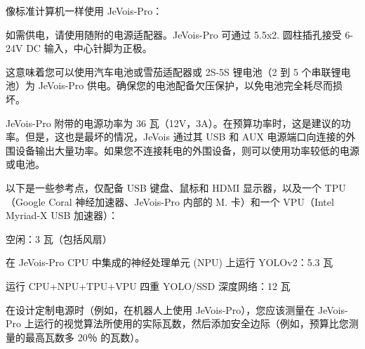 像标准计算机一样使用 Je\+Vois-\/\+Pro：

  

如需供电，请使用随附的电源适配器。\+Je\+Vois-\/\+Pro 可通过 5.\+5x2.\+5mm 圆柱插孔接受 6-\/24V DC 输入，中心针脚为正极。

这意味着您可以使用汽车电池或雪茄适配器或 2S-\/5S 锂电池（2 到 5 个串联锂电池）为 Je\+Vois-\/\+Pro 供电。确保您的电池配备欠压保护，以免电池完全耗尽而损坏。

Je\+Vois-\/\+Pro 附带的电源功率为 36 瓦（12\+V，3\+A）。在预算功率时，这是建议的功率。但是，这也是最坏的情况，\+Je\+Vois 通过其 U\+SB 和 A\+UX 电源端口向连接的外围设备输出大量功率。如果您不连接耗电的外围设备，则可以使用功率较低的电源或电池。

以下是一些参考点，仅配备 U\+SB 键盘、鼠标和 H\+D\+MI 显示器，以及一个 T\+P\+U（\+Google Coral 神经加速器、\+Je\+Vois-\/\+Pro 内部的 M. 卡）和一个 V\+P\+U（\+Intel Myriad-\/X U\+SB 加速器）：


\begin{DoxyItemize}
\item 空闲：3 瓦（包括风扇）
\item 在 Je\+Vois-\/\+Pro C\+PU 中集成的神经处理单元 (N\+PU) 上运行 Y\+O\+L\+Ov2：5.3 瓦
\item 运行 C\+P\+U+\+N\+P\+U+\+T\+P\+U+\+V\+PU 四重 Y\+O\+L\+O/\+S\+SD 深度网络：12 瓦
\end{DoxyItemize}

在设计定制电源时（例如，在机器人上使用 Je\+Vois-\/\+Pro），您应该测量在 Je\+Vois-\/\+Pro 上运行的视觉算法所使用的实际瓦数，然后添加安全边际（例如，预算比您测量的最高瓦数多 20％ 的瓦数）。 